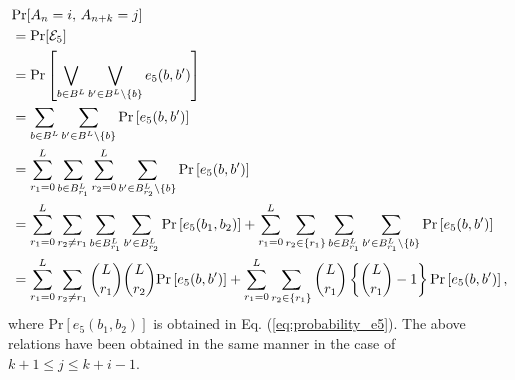 \documentclass[dvipdfmx,english]{ampmt} %
\begin{document}
\begin{align}\label{eq:joint_dist_5}
\begin{split}
  &\mathrm{Pr} [A_n=i,\, A_{n+k}=j] \\
  &=\mathrm{Pr} [\mathcal{E}_5] \\
  &= \mathrm{Pr} \left[ \bigvee_{b \in B^L} \bigvee_{b^\prime \in B^L \setminus \{b\}}
  e_5(b,b^\prime) \right] \\
  &=\sum_{b \in B^L} \sum_{b^\prime \in B^{L} \setminus \{ b \}} \mathrm{Pr} \left[ e_5(b,b^\prime) \right] \\
  &= \sum_{r_1=0}^{L} \sum_{b \in B^L_{r_1}} \sum_{r_2=0}^{L} \sum_{b^\prime \in B^L_{r_2} \setminus \{ b \}} \mathrm{Pr} \left[ e_5(b,b^\prime) \right] \\
  &= \sum_{r_1=0}^{L} \sum_{r_2 \neq r_1} \sum_{b \in B^L_{r_1}} \sum_{b^\prime \in B^L_{r_2}} \mathrm{Pr} \left[e_5(b_1,b_2) \right] 
  + \sum_{r_1=0}^{L} \sum_{r_2 \in \{r_1\}} \sum_{b \in B^L_{r_1}} \sum_{b^\prime \in B^L_{r_1} \setminus \{ b \}} \mathrm{Pr} \left[e_5(b,b^\prime) \right] \\
  &= \sum_{r_1=0}^{L} \sum_{r_2 \neq r_1} \dbinom{L}{r_1} \dbinom{L}{r_2} \mathrm{Pr} \left[e_5(b,b^\prime) \right] 
  + \sum_{r_1=0}^{L}\sum_{r_2\in\{r_1\}} \dbinom{L}{r_1} \left\{ \dbinom{L}{r_1} -1 \right\} \mathrm{Pr} \left[e_5(b,b^\prime) \right],
\end{split}
\end{align}
where $\mathrm{Pr} \left[e_5(b_1,b_2) \right]$ is obtained in Eq. (\ref{eq:probability_e5}).
The above relations have been obtained in the same manner in the case of $k+1 \leq j \leq k+i-1$.
%
\end{document}
